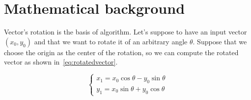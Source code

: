 \section{Mathematical background}\label{sec:math}

Vector's rotation is the basis of \cordic{} algorithm. Let's suppose to have an
input vector \((x_0, y_0)\) and that we want to rotate it of an arbitrary angle
\(\theta\). Suppose that we choose the origin as the center of the rotation, so
we can compute the rotated vector as shown in~\eqref{eq:rotatedvector}.

\begin{equation}\label{eq:rotatedvector}
	\begin{cases}
		x_1 = x_0\cos\theta - y_0\sin\theta\\
		y_1 = x_0\sin\theta + y_0\cos\theta
	\end{cases}
\end{equation}
